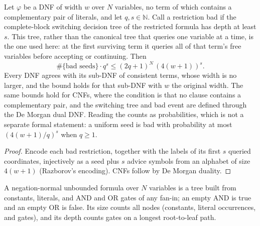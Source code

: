 \begin{theorem}
  \label{thm:lowerbounds-switching}
  \leanok
  Let $\varphi$ be a DNF of width $w$ over $N$ variables, no term of which
  contains a complementary pair of literals, and let $q, s \in \mathbb{N}$.
  Call a restriction bad if the complete-block switching decision tree of the
  restricted formula has depth at least $s$. This tree, rather than the
  canonical tree that queries one variable at a time, is the one used here: at
  the first surviving term it queries all of that term's free variables before
  accepting or continuing.
  Then
  \[ \#\{\text{bad seeds}\} \cdot q^s \le (2q + 1)^N \, (4(w + 1))^s . \]
  Every DNF agrees with its sub-DNF of consistent terms, whose width is no
  larger, and the bound holds for that sub-DNF with $w$ the original width.
  The same bounds hold for CNFs, where the condition is that no clause
  contains a complementary pair, and the switching tree and bad event are
  defined through the De Morgan dual DNF. Reading the counts as
  probabilities, which is not a separate formal statement: a uniform seed is
  bad with probability at most $(4(w+1)/q)^s$ when $q \ge 1$.
\end{theorem}
\begin{proof}
  \leanok
  Encode each bad restriction, together with the labels of its first $s$
  queried coordinates, injectively as a seed plus $s$ advice symbols from an
  alphabet of size $4(w + 1)$ (Razborov's encoding). CNFs follow by De Morgan
  duality.
\end{proof}

\begin{definition}[$\cc{AC}^0$ formula]
  \label{def:lowerbounds-ac0-formula}
  \leanok
  A negation-normal unbounded formula over $N$ variables is a tree built from
  constants, literals, and AND and OR gates of any fan-in; an empty AND is true
  and an empty OR is false. Its size counts all nodes (constants, literal
  occurrences, and gates), and its depth counts gates on a longest
  root-to-leaf path.
\end{definition}

